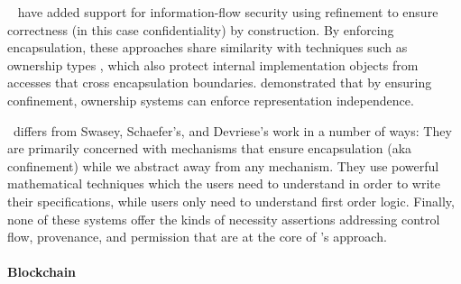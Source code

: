 {\ \cite{schaeferCbC} have
added  support for information-flow security %
using refinement to ensure correctness (in this case confidentiality) by
construction. 
By enforcing encapsulation,  %
these approaches share similarity with techniques such as
ownership types \cite{ownalias,NobPotVitECOOP98}, which also
protect internal implementation objects from accesses that cross
encapsulation boundaries.  \cite{Banerjee:2005,encaps} demonstrated that by
ensuring confinement, ownership
systems can enforce representation independence.

 

\Chainmail\ differs from Swasey, Schaefer's, and Devriese's work in a number of ways:
They are primarily concerned with %
mechanisms that ensure encapsulation (aka 
confinement) while we abstract away from any mechanism.
They use powerful mathematical techniques
which  the users need  to understand in order to write their specifications,
while \Chainmail users only need  to understand  first order logic.
Finally, none of these systems offer the kinds of
necessity assertions addressing control flow, provenance, and permission that are at the core of \Chainmail's approach.

\paragraph{Blockchain}

}
